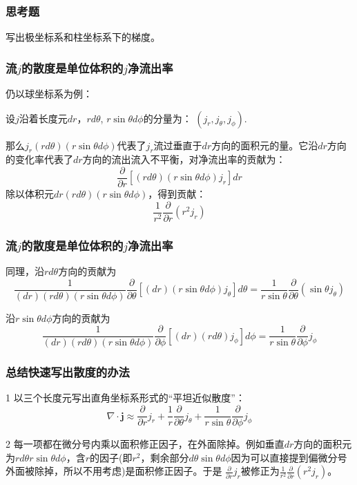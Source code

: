 \documentclass[CJK]{beamer}
\begin{document}
\begin{frame}
\frametitle{思考题}



写出极坐标系和柱坐标系下的梯度。


\end{frame}



\begin{frame}
  \frametitle{流$j$的散度是单位体积的$j$净流出率}
  

仍以球坐标系为例：

  设$j$沿着长度元$dr$，$rd\theta$, $r\sin\theta d\phi$的分量为：
  $(j_r, j_\theta, j_\phi).$

  那么$j_r(rd\theta)(r\sin\theta d\phi)$代表了$j_r$流过垂直于$dr$方向的面积元的量。它沿$dr$方向的变化率代表了$dr$方向的流出流入不平衡，对净流出率的贡献为：
  $$\frac{\partial }{\partial r} \left[(rd\theta)(r\sin\theta d\phi)j_r\right]dr$$
  除以体积元$dr (rd\theta)(r\sin\theta d\phi)$，得到贡献：
  $$\frac{1}{r^2}\frac{\partial }{\partial r} \left(r^2j_r\right)$$  
  
\end{frame}


\begin{frame}
  \frametitle{流$j$的散度是单位体积的$j$净流出率}
  

  同理，沿$rd \theta$方向的贡献为
 $$\frac{1}{(dr) (rd\theta) (r\sin\theta d\phi)}\frac{\partial }{\partial \theta} \left[(dr)(r\sin\theta d\phi)j_\theta\right] d\theta  = \frac{1}{r\sin\theta}\frac{\partial  }{\partial \theta} \left( \sin\theta j_\theta\right) $$

  沿$r\sin\theta d\phi$方向的贡献为
  $$\frac{1}{(dr) (rd\theta) (r\sin\theta d\phi)}\frac{\partial }{\partial \phi} \left[(dr)(rd\theta)j_\phi\right] d\phi = \frac{1}{r\sin\theta}\frac{\partial  }{\partial \phi} j_\phi $$
  
  
\end{frame}




\begin{frame}
  \frametitle{总结快速写出散度的办法}
  
  \bitem
\item[1]{以三个长度元写出直角坐标系形式的“平坦近似散度”：
  $$\nabla\cdot \mathbf{j} \approx \frac{\partial}{\partial r} j_r + \frac{1}{r} \frac{\partial}{\partial \theta} j_\theta + \frac{1}{r\sin\theta}\frac{\partial}{\partial \phi} j_\phi $$
}
\item[2]{每一项都在微分号内乘以面积修正因子，在外面除掉。例如垂直$dr$方向的面积元为$rd\theta r\sin\theta d\phi$，含$r$的因子(即$r^2$，剩余部分$d\theta\sin\theta d\phi$因为可以直接提到偏微分号外面被除掉，所以不用考虑)是面积修正因子。于是 $\frac{\partial}{\partial r} j_r$被修正为$\frac{1}{r^2}\frac{\partial}{\partial r} (r^2j_r)$。
}
  \eitem
  
\end{frame}
\end{document}
